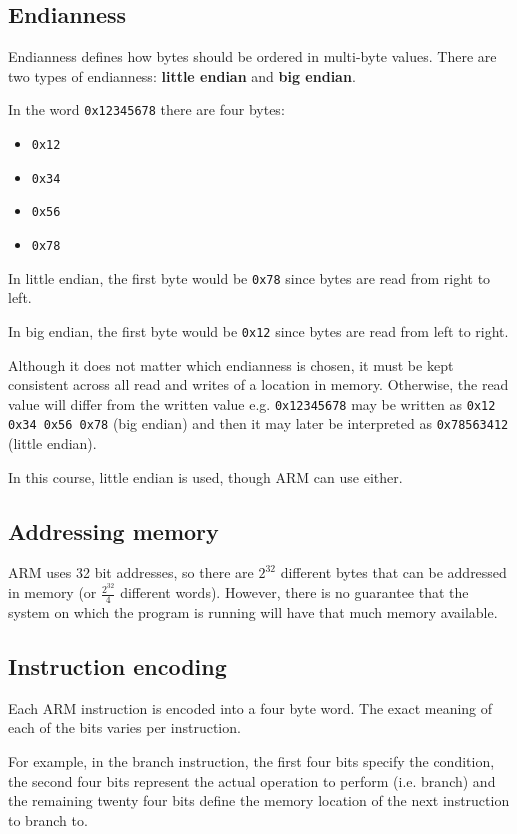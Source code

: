 \subsection{Endianness}

Endianness defines how bytes should be ordered in multi-byte values.
There are two types of endianness: {\bf little endian} and {\bf big endian}.

In the word {\tt 0x12345678} there are four bytes:
\begin{itemize}
	\item {\tt 0x12}
	\item {\tt 0x34}
	\item {\tt 0x56}
	\item {\tt 0x78}
\end{itemize}

In little endian, the first byte would be {\tt 0x78} since bytes are read from
right to left.

In big endian, the first byte would be {\tt 0x12} since bytes are read from left
to right.

Although it does not matter which endianness is chosen, it must be kept
consistent across all read and writes of a location in memory. Otherwise, the
read value will differ from the written value e.g. {\tt 0x12345678} may be
written as {\tt 0x12 0x34 0x56 0x78} (big endian) and then it may later be
interpreted as {\tt 0x78563412} (little endian).

In this course, little endian is used, though ARM can use either.

\subsection{Addressing memory}

ARM uses 32 bit addresses, so there are $2^{32}$ different bytes that can be
addressed in memory (or $\frac{2^{32}}{4}$ different words). However, there is
no guarantee that the system on which the program is running will have that much
memory available.

\subsection{Instruction encoding}

Each ARM instruction is encoded into a four byte word. The exact meaning of each
of the bits varies per instruction.

For example, in the branch instruction, the first four bits specify the
condition, the second four bits represent the actual operation to perform (i.e.
branch) and the remaining twenty four bits define the memory location of the
next instruction to branch to.

